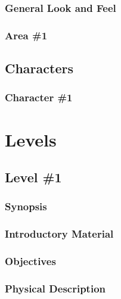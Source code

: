 \documentclass[12pt,titlepage]{article}
\begin{document}
\subsubsection{General Look and Feel}

\subsubsection{Area \#1}


\subsection{Characters}

\subsubsection{Character \#1}


\newpage
\section{Levels}

\subsection{Level \#1}

\subsubsection{Synopsis}

\subsubsection{Introductory Material}

\subsubsection{Objectives}

\subsubsection{Physical Description}
\end{document}
